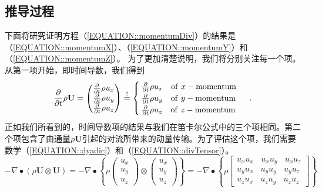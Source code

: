 \documentclass[LBMDerivation.tex]{subfiles}
\begin{document}
\subsection{推导过程}
%
%
    下面将研究证明方程（\ref{EQUATION::momentumDiv}）的结果是（\ref{EQUATION::momentumX}）、（\ref{EQUATION::momentumY}）和（\ref{EQUATION::momentumZ}）。
%
%
    为了更加清楚说明，我们将分别关注每一个项。从第一项开始，即时间导数，我们得到
%
%
\begin{equation}
  \frac{\partial}{\partial t} \rho \textbf{U}
=
  \left(
  \begin{matrix}
      \frac{\partial}{\partial t} \rho u_x \\
      \frac{\partial}{\partial t} \rho u_y \\
      \frac{\partial}{\partial t} \rho u_z
  \end{matrix}
  \right)
\overset{!}{=}
\begin{cases}
  \frac{\partial}{\partial t} \rho u_x  ~~~ \mathrm{of~}x-\mathrm{momentum}\\
  \frac{\partial}{\partial t} \rho u_y  ~~~ \mathrm{of~}y-\mathrm{momentum}\\
  \frac{\partial}{\partial t} \rho u_z  ~~~ \mathrm{of~}z-\mathrm{momentum}
\end{cases} ~.
\end{equation}
%
%
    正如我们所看到的，时间导数项的结果与我们在笛卡尔公式中的三个项相同。第二个项包含了由通量$\rho\textbf{U}$引起的对流所带来的动量传输。为了评估这个项，我们需要数学（\ref{EQUATION::dyadic}）和（\ref{EQUATION::divTensor}）。
%
%
\begin{equation*}
 -   \nabla \bullet \left(\rho\textbf{U} \otimes \textbf{U}\right)
=
-   \nabla \bullet
  \left\{
  \rho
  \left(
  \begin{matrix}
    u_x \\
    u_y \\
    u_z
  \end{matrix}
  \right)
\otimes
\left(
  \begin{matrix}
    u_x \\
    u_y \\
    u_z
  \end{matrix}
  \right)
  \right\}
=
-   \nabla \bullet
  \left\{
  \rho
  \left[
  \begin{matrix}
    u_x u_x ~~~~ u_x u_y ~~~~ u_x u_z \\
    u_y u_x ~~~~ u_y u_y ~~~~ u_y u_z \\
    u_z u_x ~~~~ u_z u_y ~~~~ u_z u_z
  \end{matrix}
  \right]
  \right\}
\end{equation*}
\end{document}
